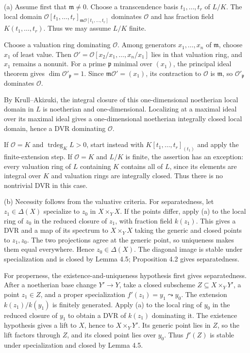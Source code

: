 (a) Assume first that $\mathfrak m\ne0$. Choose a transcendence basis $t_1,\ldots,t_r$ of $L/K$. The local domain $\mathcal O[t_1,\ldots,t_r]_{\mathfrak m\mathcal O[t_1,\ldots,t_r]}$ dominates $\mathcal O$ and has fraction field $K(t_1,\ldots,t_r)$. Thus we may assume $L/K$ finite.

Choose a valuation ring dominating $\mathcal O$. Among generators $x_1,\ldots,x_n$ of $\mathfrak m$, choose $x_1$ of least value. Then $\mathcal O'=\mathcal O[x_2/x_1,\ldots,x_n/x_1]$ lies in that valuation ring, and $x_1$ remains a nonunit. For a prime $\mathfrak p$ minimal over $(x_1)$, the principal ideal theorem gives $\dim\mathcal O'_{\mathfrak p}=1$. Since $\mathfrak m\mathcal O'=(x_1)$, its contraction to $\mathcal O$ is $\mathfrak m$, so $\mathcal O'_{\mathfrak p}$ dominates $\mathcal O$.

By Krull--Akizuki, the integral closure of this one-dimensional noetherian local domain in $L$ is noetherian and one-dimensional. Localizing at a maximal ideal over its maximal ideal gives a one-dimensional noetherian integrally closed local domain, hence a DVR dominating $\mathcal O$.

If $\mathcal O=K$ and $\operatorname{trdeg}_KL>0$, start instead with $K[t_1,\ldots,t_r]_{(t_1)}$ and apply the finite-extension step. If $\mathcal O=K$ and $L/K$ is finite, the assertion has an exception: every valuation ring of $L$ containing $K$ contains all of $L$, since its elements are integral over $K$ and valuation rings are integrally closed. Thus there is no nontrivial DVR in this case.

(b) Necessity follows from the valuative criteria. For separatedness, let $z_1\in\Delta(X)$ specialize to $z_0$ in $X\times_YX$. If the points differ, apply (a) to the local ring of $z_0$ in the reduced closure of $z_1$, with fraction field $k(z_1)$. This gives a DVR and a map of its spectrum to $X\times_YX$ taking the generic and closed points to $z_1,z_0$. The two projections agree at the generic point, so uniqueness makes them equal everywhere. Hence $z_0\in\Delta(X)$. The diagonal image is stable under specialization and is closed by Lemma 4.5; Proposition 4.2 gives separatedness.

For properness, the existence-and-uniqueness hypothesis first gives separatedness. After a noetherian base change $Y'\to Y$, take a closed subscheme $Z\subseteq X\times_YY'$, a point $z_1\in Z$, and a proper specialization $f'(z_1)=y_1\leadsto y_0$. The extension $k(z_1)/k(y_1)$ is finitely generated. Apply (a) to the local ring of $y_0$ in the reduced closure of $y_1$ to obtain a DVR of $k(z_1)$ dominating it. The existence hypothesis gives a lift to $X$, hence to $X\times_YY'$. Its generic point lies in $Z$, so the lift factors through $Z$, and its closed point lies over $y_0$. Thus $f'(Z)$ is stable under specialization and closed by Lemma 4.5.

